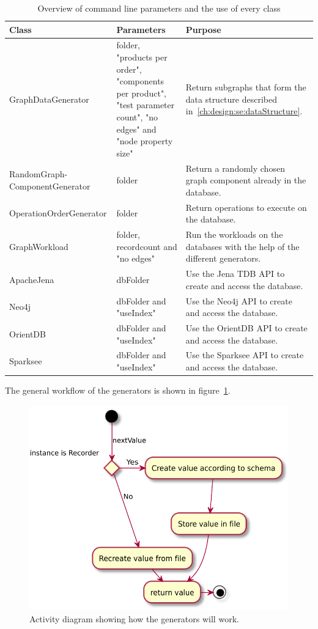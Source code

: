 \begin{table}[h!]
  \begin{minipage}{\textwidth}
    \begin{tabularx}{\textwidth}{ | X | X | X | }
      \hline
      Class & Parameters & Purpose \\ \hline
      GraphDataGenerator & folder, "products per order", "components per product", "test parameter count", "no edges" and "node property size" & Return subgraphs that form the data structure described in~\ref{ch:design:se:dataStructure}. \\ \hline
      RandomGraph-\newline ComponentGenerator & folder & Return a randomly chosen graph component already in the database. \\ \hline
      OperationOrderGenerator & folder & Return operations to execute on the database. \\ \hline
      GraphWorkload & folder, recordcount and "no edges" & Run the workloads on the databases with the help of the different generators. \\ \hline
      ApacheJena & dbFolder & Use the Jena TDB API to create and access the database. \\ \hline
      Neo4j & dbFolder and "useIndex" & Use the Neo4j API to create and access the database. \\ \hline
      OrientDB & dbFolder and "useIndex" & Use the OrientDB API to create and access the database. \\ \hline
      Sparksee & dbFolder and "useIndex" & Use the Sparksee API to create and access the database. \\ \hline
    \end{tabularx}
  \end{minipage}
  \caption{Overview of command line parameters and the use of every class}
  \label{tab:designOverview}
\end{table}

The general workflow of the generators is shown in figure~\ref{fig:generalGeneratorWorkflow}.

\begin{figure}[h!]
  \centering
  \includegraphics[width=.75\textwidth]{images/extensions/generalGeneratorWorkflow}
  \caption{Activity diagram showing how the generators will work.}
  \label{fig:generalGeneratorWorkflow}
\end{figure}

